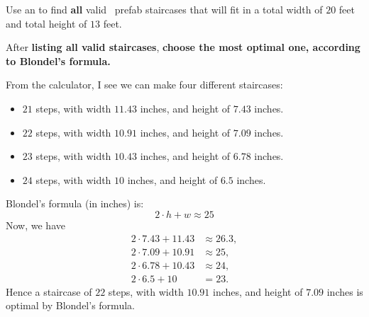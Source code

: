 \documentclass[noauthor,nooutcomes,handout]{ximera}
\begin{document}
\begin{question}
  Use an  to
  find \textbf{all} valid \mooculus~prefab staircases that will fit in
  a total width of $20$ feet and total height of $13$ feet.

 After \textbf{listing all valid staircases}, \textbf{choose the most optimal one,
 according to Blondel's formula.}

  \begin{freeResponse}
    From the calculator, I see we can make four different staircases:
    \begin{itemize}
    \item $21$ steps, with width $11.43$ inches, and height of $7.43$ inches.
    \item $22$ steps, with width $10.91$ inches, and height of $7.09$ inches.
    \item $23$ steps, with width $10.43$ inches, and height of $6.78$ inches.
    \item $24$ steps, with width $10$ inches, and height of $6.5$ inches.
    \end{itemize}
    Blondel's formula (in inches) is:
    \[
    2\cdot h + w \approx 25
    \]
    Now, we have
    \begin{align*}
      2\cdot 7.43 + 11.43 &\approx 26.3,\\
      2\cdot 7.09 + 10.91 &\approx 25,\\
      2\cdot 6.78 + 10.43 &\approx 24,\\
      2\cdot 6.5 + 10 &= 23.
    \end{align*}
    Hence a staircase of $22$ steps, with width $10.91$ inches, and
    height of $7.09$ inches is optimal by Blondel's formula.
  \end{freeResponse}
\end{question}
\mynewpage
\end{document}

